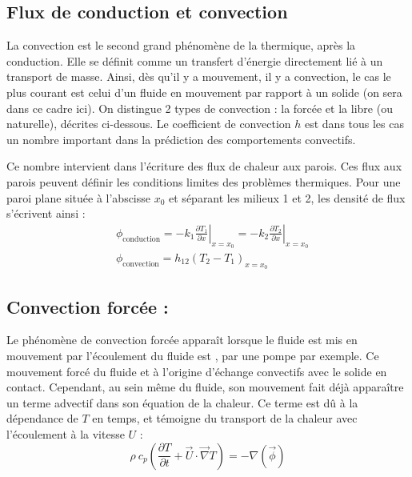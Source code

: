 

\subsection{Flux de conduction et convection}
La convection est le second grand phénomène de la thermique, après la conduction. Elle se définit comme un transfert d'énergie directement lié à un transport de masse. Ainsi, dès qu'il y a mouvement, il y a convection, le cas le plus courant est celui d'un fluide en mouvement par rapport à un solide (on sera dans ce cadre ici). On distingue 2 types de convection : la forcée et la libre (ou naturelle), décrites ci-dessous. Le coefficient de convection $h$ est dans tous les cas un nombre important dans la prédiction des comportements convectifs.

Ce nombre intervient dans l'écriture des flux de chaleur aux parois. Ces flux aux parois peuvent définir les conditions limites des problèmes thermiques. Pour une paroi plane située à l'abscisse $x_0$ et séparant les milieux 1 et 2, les densité de flux s'écrivent ainsi :
%
\begin{align}[left=\empheqlbrace]
 &\phi_{\text{conduction}}
 = - k_1 \left. \frac{\partial{T_1}}{\partial{x}} \right|_{x=x_0}
 = - k_2 \left. \frac{\partial{T_2}}{\partial{x}} \right|_{x=x_0} \\
 &\phi_{\text{convection}}
 = h_{12} \left( T_2 - T_1 \right)_{x=x_0}
 \label{eq:fluxth}
\end{align}


\subsection{Convection forcée :}
Le phénomène de convection forcée apparaît lorsque le fluide est mis en mouvement par
l'écoulement du fluide est , par une pompe par exemple. Ce mouvement forcé du fluide et à l'origine d'échange convectifs avec le solide en contact. Cependant, au sein même du fluide, son mouvement fait déjà apparaître un terme advectif dans son équation de la chaleur. Ce terme est dû à la dépendance de $T$ en temps, et témoigne du transport de la chaleur avec l'écoulement à la vitesse $U$ :
%
\begin{equation}
\rho~c_{p} \left( \frac{\partial T}{\partial t}
+ \vec{U} \cdot \vec{\nabla} T \right)
= - \nabla(\vec{\phi})
\end{equation}

